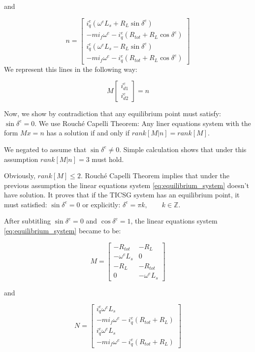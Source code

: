 \documentclass[conference]{IEEEtran}
\begin{document}
and 

\[
n=\left[\begin{array}{c}
i_{q}^{e}\left(\omega^{e}L_{s}+R_{L}\sin\delta^{e}\right)\\
-mi_{f}\omega^{e}-i_{q}^{e}\left(R_{tot}+R_{L}\cos\delta^{e}\right)\\
i_{q}^{e}\left(\omega^{e}L_{s}-R_{L}\sin\delta^{e}\right)\\
-mi_{f}\omega^{e}-i_{q}^{e}\left(R_{tot}+R_{L}\cos\delta^{e}\right)
\end{array}\right]
\]
We represent this lines in the following way:

\begin{equation}
M\left[\begin{array}{c}
i_{d1}^{e}\\
i_{d2}^{e}
\end{array}\right]=n\label{eq:equilibrium_system}
\end{equation}

Now, we  show by contradiction that any equilibrium point must satisfy: $\sin\delta^e=0$.
We use Rouch\'e Capelli Theorem:  Any liner equations system with the form  $Mx=n$ has a  solution if and only if $rank\left[M|n\right]=rank\left[M\right].$

We negated to assume that $\sin\delta^{e}\ne0$. Simple calculation shows that under this assumption   $rank\left[M|n\right]=3$ must hold.

Obviously, $rank\left[M\right]\le2$.  Rouch\'e Capelli Theorem implies that under the
previous assumption the linear equations system \eqref{eq:equilibrium_system} doesn't have solution. It proves that  if the TICSG system has an equilibrium point, it must satisfied: $\sin\delta^{e}=0$ or explicitly: $\delta^{e}=\pi k,\qquad k\in\mathbb{Z}.$

After subtitling $\sin\delta^{e}=0$
and $\cos\delta^{e}=1$, the linear equations system  \eqref{eq:equilibrium_system} became to be:

$$
M=\left[\begin{array}{cc}
-R_{tot} & -R_{L}\\
-\omega^{e}L_{s} & 0\\
-R_{L} & -R_{tot}\\
0 & -\omega^{e}L_{s}
\end{array}\right]
$$

and 

$$
N=\left[\begin{array}{c}
i_{q}^{e}\omega^{e}L_{s}\\
-mi_{f}\omega^{e}-i_{q}^{e}\left(R_{tot}+R_{L}\right)\\
i_{q}^{e}\omega^{e}L_{s}\\
-mi_{f}\omega^{e}-i_{q}^{e}\left(R_{tot}+R_{L}\right)
\end{array}\right]
$$
\end{document}
